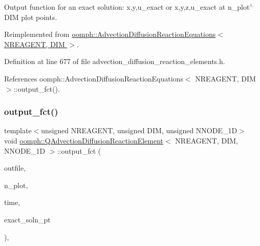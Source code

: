 Output function for an exact solution\+: x,y,u\+\_\+exact or x,y,z,u\+\_\+exact at n\+\_\+plot$^\wedge$\+D\+IM plot points. 



Reimplemented from \hyperlink{classoomph_1_1AdvectionDiffusionReactionEquations_af540c03c411843c566c81af918d620c2}{oomph\+::\+Advection\+Diffusion\+Reaction\+Equations$<$ N\+R\+E\+A\+G\+E\+N\+T, D\+I\+M $>$}.



Definition at line 677 of file advection\+\_\+diffusion\+\_\+reaction\+\_\+elements.\+h.



References oomph\+::\+Advection\+Diffusion\+Reaction\+Equations$<$ N\+R\+E\+A\+G\+E\+N\+T, D\+I\+M $>$\+::output\+\_\+fct().

\mbox{\label{classoomph_1_1QAdvectionDiffusionReactionElement_aced1d7c07e1e49b95aff9b354676808b}} 
\subsubsection{\texorpdfstring{output\+\_\+fct()}{output\_fct()}\hspace{0.1cm}{\footnotesize\ttfamily [2/2]}}
{\footnotesize\ttfamily template$<$unsigned N\+R\+E\+A\+G\+E\+NT, unsigned D\+IM, unsigned N\+N\+O\+D\+E\+\_\+1D$>$ \\
void \hyperlink{classoomph_1_1QAdvectionDiffusionReactionElement}{oomph\+::\+Q\+Advection\+Diffusion\+Reaction\+Element}$<$ N\+R\+E\+A\+G\+E\+NT, D\+IM, N\+N\+O\+D\+E\+\_\+1D $>$\+::output\+\_\+fct (\begin{DoxyParamCaption}\item[{std\+::ostream \&}]{outfile,  }\item[{const unsigned \&}]{n\+\_\+plot,  }\item[{const double \&}]{time,  }\item[{\hyperlink{classoomph_1_1FiniteElement_ad4ecf2b61b158a4b4d351a60d23c633e}{Finite\+Element\+::\+Unsteady\+Exact\+Solution\+Fct\+Pt}}]{exact\+\_\+soln\+\_\+pt }\end{DoxyParamCaption})\hspace{0.3cm}{\ttfamily [inline]}, {\ttfamily [virtual]}}



